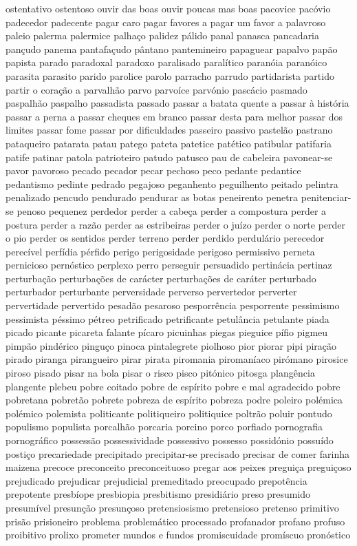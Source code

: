 \documentclass[ruledheader]{abnt_UFF}
\begin{document}
ostentativo ostentoso ouvir das boas ouvir poucas mas boas pacovice pac\'{o}vio padecedor padecente pagar caro pagar favores a pagar um favor a palavroso paleio palerma palermice palha\c{c}o palidez p\'{a}lido panal panasca pancadaria pan\c{c}udo panema pantafa\c{c}udo p\^{a}ntano pantemineiro papaguear papalvo pap\~ao papista parado paradoxal paradoxo paralisado paral\'{i}tico paran\'{o}ia paran\'{o}ico parasita parasito parido parolice parolo parracho parrudo partidarista partido partir o cora\c{c}\~ao a parvalh\~ao parvo parvo\'{i}ce parv\'{o}nio pasc\'{a}cio pasmado paspalh\~ao paspalho passadista passado passar a batata quente a passar \`{a} hist\'{o}ria passar a perna a passar cheques em branco passar desta para melhor passar dos limites passar fome passar por dificuldades passeiro passivo pastel\~ao pastrano pataqueiro patarata patau patego pateta patetice pat\'{e}tico patibular patifaria patife patinar patola patrioteiro patudo patusco pau de cabeleira pavonear-se pavor pavoroso pecado pecador pecar pechoso peco pedante pedantice pedantismo pedinte pedrado pegajoso peganhento peguilhento peitado pelintra penalizado pencudo pendurado pendurar as botas peneirento penetra penitenciar-se penoso pequenez perdedor perder a cabe\c{c}a perder a compostura perder a postura perder a raz\~ao perder as estribeiras perder o ju\'{i}zo perder o norte perder o pio perder os sentidos perder terreno perder perdido perdul\'{a}rio perecedor perec\'{i}vel perf\'{i}dia p\'{e}rfido perigo perigosidade perigoso permissivo perneta pernicioso pern\'{o}stico perplexo perro perseguir persuadido pertin\'{a}cia pertinaz perturba\c{c}\~ao perturba\c{c}\~oes de car\'{a}cter perturba\c{c}\~oes de car\'{a}ter perturbado perturbador perturbante perversidade perverso pervertedor perverter pervertidade pervertido pesad\~ao pesaroso pesporr\^{e}ncia pesporrente pessimismo pessimista p\'{e}ssimo p\'{e}treo petrificado petrificante petul\^{a}ncia petulante piada picado picante picareta falante p\'{i}caro picuinhas piegas pieguice p\'{i}fio pigmeu pimp\~ao pind\'{e}rico pingu\c{c}o pinoca pintalegrete piolhoso pior piorar pipi pira\c{c}\~ao pirado piranga pirangueiro pirar pirata piromania piroman\'{i}aco pir\'{o}mano pirosice piroso pisado pisar na bola pisar o risco pisco pit\'{o}nico pitosga plang\^{e}ncia plangente plebeu pobre coitado pobre de esp\'{i}rito pobre e mal agradecido pobre pobretana pobret\~ao pobrete pobreza de esp\'{i}rito pobreza podre poleiro pol\'{e}mica pol\'{e}mico polemista politicante politiqueiro politiquice poltr\~ao poluir pontudo populismo populista porcalh\~ao porcaria porcino porco porfiado pornografia pornogr\'{a}fico possess\~ao possessividade possessivo possesso possid\'{o}nio possu\'{i}do posti\c{c}o precariedade precipitado precipitar-se precisado precisar de comer farinha maizena precoce preconceito preconceituoso pregar aos peixes pregui\c{c}a pregui\c{c}oso prejudicado prejudicar prejudicial premeditado preocupado prepot\^{e}ncia prepotente presb\'{i}ope presbiopia presbitismo presidi\'{a}rio preso presumido presum\'{i}vel presun\c{c}\~ao presun\c{c}oso pretensiosismo pretensioso pretenso primitivo pris\~ao prisioneiro problema problem\'{a}tico processado profanador profano profuso proibitivo prolixo prometer mundos e fundos promiscuidade prom\'{i}scuo pron\'{o}stico 
\end{document}
